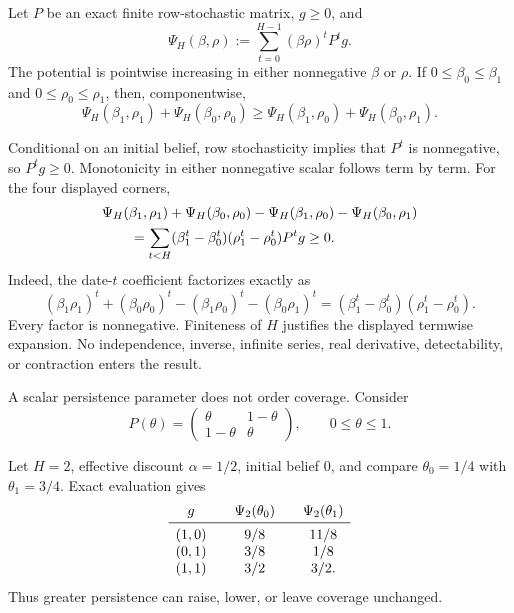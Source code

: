 \begin{theorem}
\label{thm:discount-survival-complementarity}
Let \(P\) be an exact finite row-stochastic matrix, \(g\ge0\), and
\[
  \Psi_H(\beta,\rho)
    :=\sum_{t=0}^{H-1}(\beta\rho)^tP^tg .
\]
The potential is pointwise increasing in either nonnegative \(\beta\) or
\(\rho\).  If \(0\le\beta_0\le\beta_1\) and
\(0\le\rho_0\le\rho_1\), then, componentwise,
\begin{equation}\label{eq:discount-survival-cross-difference}
  \Psi_H(\beta_1,\rho_1)+\Psi_H(\beta_0,\rho_0)
  \ge
  \Psi_H(\beta_1,\rho_0)+\Psi_H(\beta_0,\rho_1).
\end{equation}
\end{theorem}

Conditional on an initial belief, row stochasticity implies that \(P^t\) is
nonnegative, so \(P^tg\ge0\).  Monotonicity in either nonnegative scalar
follows term by term.  For the four displayed corners,
\begin{align}
 &\Psi_H(\beta_1,\rho_1)+\Psi_H(\beta_0,\rho_0)
 -\Psi_H(\beta_1,\rho_0)-\Psi_H(\beta_0,\rho_1)\notag\\
 &\qquad=
 \sum_{t<H}
 (\beta_1^t-\beta_0^t)(\rho_1^t-\rho_0^t)P^tg
 \ge0.
 \label{eq:discount-survival-factorization}
\end{align}
Indeed, the date-\(t\) coefficient factorizes exactly as
\[
 (\beta_1\rho_1)^t+(\beta_0\rho_0)^t
 -(\beta_1\rho_0)^t-(\beta_0\rho_1)^t
 =
 (\beta_1^t-\beta_0^t)(\rho_1^t-\rho_0^t).
\]
Every factor is nonnegative.  Finiteness of \(H\) justifies the displayed
termwise expansion.  No independence, inverse, infinite series, real
derivative, detectability, or contraction enters the result.

A scalar persistence parameter does not order coverage.  Consider
\[
 P(\theta)=
 \begin{pmatrix}
   \theta&1-\theta\\
   1-\theta&\theta
 \end{pmatrix},
 \qquad 0\le\theta\le1.
\]

\begin{proposition}
\label{prop:no-universal-persistence-sign}
Let \(H=2\), effective discount \(\alpha=1/2\), initial belief \(0\), and
compare \(\theta_0=1/4\) with \(\theta_1=3/4\).  Exact evaluation gives
\[
\begin{array}{c@{\qquad}c@{\qquad}c}
g & \Psi_2(\theta_0) & \Psi_2(\theta_1)\\
\midrule
(1,0) & 9/8 & 11/8\\
(0,1) & 3/8 & 1/8\\
(1,1) & 3/2 & 3/2.
\end{array}
\]
Thus greater persistence can raise, lower, or leave coverage unchanged.
\end{proposition}

